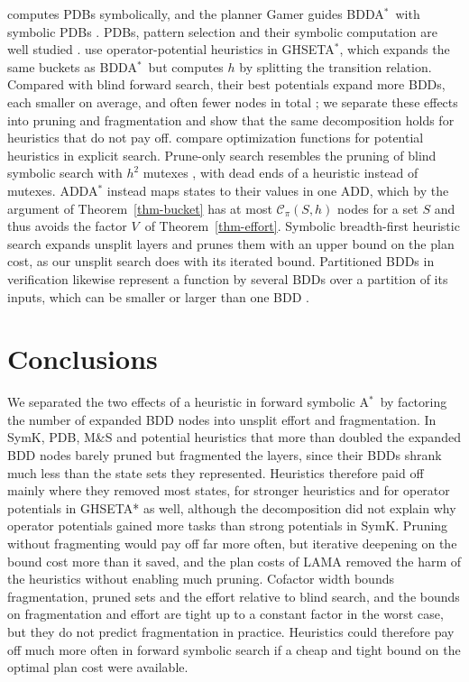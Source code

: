 \documentclass[letterpaper]{article}
\newcommand{\cutprod}[2]{\ensuremath{\mathcal{C}_{\pi}(#1,#2)}}
\newcommand{\values}{\ensuremath{V}}
\newcommand{\bddastar}{BDDA\ensuremath{^{*}}}
\newcommand{\astar}{A\ensuremath{^{*}}}
\newcommand{\ghseta}{GHSETA\ensuremath{^{*}}}
\theoremstyle{plain}
\theoremstyle{definition}
\theoremstyle{remark}
\begin{document}
\citet{edelkamp-aips2002} computes PDBs symbolically, and the planner Gamer guides \bddastar\ with symbolic PDBs \citep{kissmann-edelkamp-aaai2011,edelkamp-et-al-aaai2015}.
PDBs, pattern selection and their symbolic computation are well studied \citep{culberson-schaeffer-compint1998,edelkamp-ecp2001,haslum-et-al-aaai2007,rovner-et-al-icaps2019,edelkamp-et-al-ecai2012}.
\citet{fiser-et-al-aaai2022,fiser-et-al-aij2024} use operator-potential heuristics in \ghseta, which expands the same buckets as \bddastar\ but computes $h$ by splitting the transition relation.
Compared with blind forward search, their best potentials expand more BDDs, each smaller on average, and often fewer nodes in total \citep{fiser-et-al-aaai2022}; we separate these effects into pruning and fragmentation and show that the same decomposition holds for heuristics that do not pay off.
\citet{seipp-et-al-icaps2015} compare optimization functions for potential heuristics in explicit search.
Prune-only search resembles the pruning of blind symbolic search with $h^2$ mutexes \citep{torralba-et-al-aij2017}, with dead ends of a heuristic instead of mutexes.
ADDA\ensuremath{^{*}} \citep{hansen-et-al-sara2002} instead maps states to their values in one ADD, which by the argument of Theorem~\ref{thm-bucket} has at most $\cutprod{S}{h}$ nodes for a set $S$ and thus avoids the factor \values\ of Theorem~\ref{thm-effort}.
Symbolic breadth-first heuristic search \citep{jensen-et-al-icaps2006} expands unsplit layers and prunes them with an upper bound on the plan cost, as our unsplit search does with its iterated bound.
Partitioned BDDs in verification likewise represent a function by several BDDs over a partition of its inputs, which can be smaller or larger than one BDD \citep{narayan-et-al-iccad1996}.

\section{Conclusions}

We separated the two effects of a heuristic in forward symbolic \astar\ by factoring the number of expanded BDD nodes into unsplit effort and fragmentation.
In SymK, PDB, M\&S and potential heuristics that more than doubled the expanded BDD nodes barely pruned but fragmented the layers, since their BDDs shrank much less than the state sets they represented.
Heuristics therefore paid off mainly where they removed most states, for stronger heuristics and for operator potentials in GHSETA* as well, although the decomposition did not explain why operator potentials gained more tasks than strong potentials in SymK.
Pruning without fragmenting would pay off far more often, but iterative deepening on the bound cost more than it saved, and the plan costs of LAMA removed the harm of the heuristics without enabling much pruning.
Cofactor width bounds fragmentation, pruned sets and the effort relative to blind search, and the bounds on fragmentation and effort are tight up to a constant factor in the worst case, but they do not predict fragmentation in practice.
Heuristics could therefore pay off much more often in forward symbolic search if a cheap and tight bound on the optimal plan cost were available.
\end{document}
